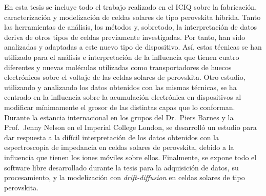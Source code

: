 
En esta tesis se incluye todo el trabajo realizado en el ICIQ sobre la fabricación, caracterización y modelización de celdas solares de tipo perovskita híbrida.
Tanto las herramientas de análisis, los métodos y, sobretodo, la interpretación de datos deriva de otros tipos de celdas previamente investigadas.
Por tanto, han sido analizadas y adaptadas a este nuevo tipo de dispositivo.
Así, estas técnicas se han utilizado para el análisis e interpretación de la influencia que tienen cuatro diferentes y nuevas moléculas utilizadas como transportadores de huecos electrónicos sobre el voltaje de las celdas solares de perovskita.
Otro estudio, utilizando y analizando los datos obtenidos con las mismas técnicas, se ha centrado en la influencia sobre la acumulación electrónica en dispositivos al modificar mínimamente el grosor de las distintas capas que lo conforman.
Durante la estancia internacional en los grupos del Dr.\ Piers Barnes y la Prof.\ Jenny Nelson en el Imperial College London, se desarrolló un estudio para dar respuesta a la difícil interpretación de los datos obtenidos con la espectroscopía de impedancia en celdas solares de perovskita, debido a la influencia que tienen los iones móviles sobre ellos.
Finalmente, se expone todo el software libre desarrollado durante la tesis para la adquisición de datos, su procesamiento, y la modelización con \textsl{drift\hyp{}diffusion} en celdas solares de tipo perovskita.


